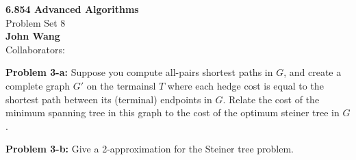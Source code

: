 \documentclass[psamsfonts]{amsart}
\newenvironment{sol}{\vspace{0.25cm}{\large \bfseries Solution:}}{\qedsymbol}
\newenvironment{prob}[1]{\begin{framed}{\large \bfseries Problem #1:}}{\end{framed}}
\newcommand{\makenewtitle}{
    \begin{center}
    {\huge \bfseries 6.854 Advanced Algorithms} \\
    Problem Set 8\\
    \vspace{0.25cm}
    {\bfseries John Wang} \\
    Collaborators:  
    \end{center}
    \vspace{0.5cm}
}
\begin{document}
\newpage
\makenewtitle

\begin{prob}{3-a}
Suppose you compute all-pairs shortest paths in $G$, and create a complete graph $G'$ on the termainsl $T$ where each hedge cost is equal to the shortest path between its (terminal) endpoints in $G$. Relate the cost of the minimum spanning tree in this graph to the cost of the optimum steiner tree in $G$. 
\end{prob}
\begin{sol}

\end{sol}

\begin{prob}{3-b}
Give a 2-approximation for the Steiner tree problem.
\end{prob}
\begin{sol}

\end{sol}
\end{document}
